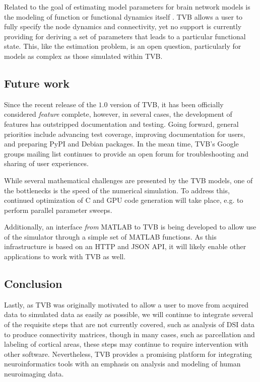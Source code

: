 \documentclass{bioinfo}
\begin{document}
Related to the goal of estimating model parameters for brain network models
is the modeling of function or functional dynamics itself 
\citep{erlhagen2002dynamic, eliasmith2012large}. TVB allows a user
to fully specify the node dynamics and connectivity, yet no support
is currently providing for deriving a set of parameters that leads to 
a particular functional state. This, like the estimation problem, is 
an open question, particularly for models as complex as those simulated 
within TVB.

\subsection{Future work}

Since the recent release of the $1.0$ version of TVB, it has been 
officially considered \textit{feature} complete, however, in several
cases, the development of features has outstripped documentation 
and testing. Going forward, general priorities include
advancing test coverage, improving documentation for users, and
preparing PyPI and Debian packages. In the mean
time, TVB's Google groups mailing list continues to
provide an open forum for troubleshooting and sharing of user experiences.

While several mathematical challenges are presented by the TVB models, 
one of the bottlenecks is the speed of the numerical simulation.
To address this, continued optimization of C and GPU code generation
will take place, e.g. to perform parallel parameter sweeps. 

Additionally, an interface \textit{from} MATLAB to TVB 
is being developed to allow use of the simulator through a simple
set of MATLAB functions. As this infrastructure is based on an HTTP and 
JSON API, it will likely enable other applications to work with TVB as well.

\subsection{Conclusion}

Lastly, as TVB was originally motivated to allow a user to move from acquired
data to simulated data as easily as possible, we will continue to integrate
several of the requisite steps that are not currently covered, such as analysis
of DSI data to produce connectivity matrices, though in many cases, such as
parcellation and labeling of cortical areas, these steps may continue to
require intervention with other software. Nevertheless, TVB provides a
promising platform for integrating neuroinformatics tools with an emphasis on
analysis and modeling of human neuroimaging data.
\end{document}
